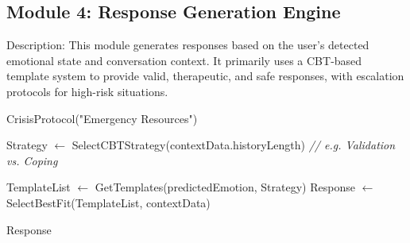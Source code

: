 \subsection{Module 4: Response Generation Engine}
Description: 
This module generates responses based on the user's detected emotional state and conversation context. It primarily uses a CBT-based template system to provide valid, therapeutic, and safe responses, with escalation protocols for high-risk situations.

\begin{algorithm}[H]
\caption{Response Generation Engine Algorithm}
\begin{algorithmic}[1]
        \State \Return CrisisProtocol("Emergency Resources")
    \EndIf

    \State Strategy $\gets$ SelectCBTStrategy(contextData.historyLength)
    \State \textit{// e.g. Validation vs. Coping}
    
    \State TemplateList $\gets$ GetTemplates(predictedEmotion, Strategy)
    \State Response $\gets$ SelectBestFit(TemplateList, contextData)
    
    \State \Return Response
\EndProcedure
\end{algorithmic}
\end{algorithm}
